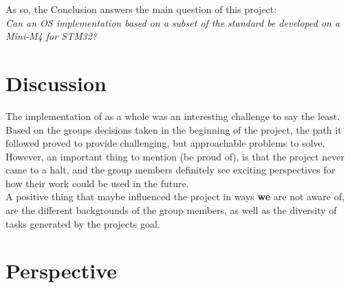 As so, the Conclusion answers the main question of this project:\\
\textit{Can an OS implementation based on a subset of the \arinc{} standard be
developed on a Mini-M4 for STM32?}
\clearpage

\section{Discussion}
\iffalse
The main concerns presented by the forums communities were the security levels of the implementation of
this OS. The two main topics were: how to identify an error and how to track it to the origin and how the
system will react to different levels of failure, from small to fatal errors. If the entire system would
reboot, only restart the partition or block it.\\
Other problems suggested were related to the interrupts, when context switching if the next partition
would also have access to all them, and how the control is made to prevent any errors related.\\
The idea of an OpenSource implementation like this was well accepted due to the lack of examples avaiable.
It was given an example of an implementation in the USA, of a similar system and that is still used for
communication infrastructures.
The whole text is presented in the \nameref{chap:Forum Responces}.
\todo{can't make the refrence work, help!}
\fi

The implementation of \OSname{} as a whole was an interesting challenge
to say the least. Based on the group\textquotesingle s decisions taken in the beginning 
of the project, the path it followed proved to provide challenging, but
approachable problems to solve. However, an important thing to mention
(be proud of), is that the project never came to a halt, and the group 
members definitely see exciting perspectives for how their work could be
used in the future. \\
A positive thing that maybe influenced the project in ways \textbf{we} are 
not aware of, are the different backgrounds of the group members, as well as
the diversity of tasks generated by the project\textquotesingle s goal.

\section{Perspective}
